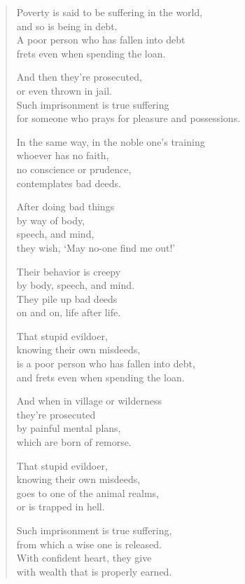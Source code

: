 \documentclass[12pt,openany]{book}%
\begin{document}
\begin{verse}%
Poverty is said to be suffering in the world, \\
and so is being in debt. \\
A poor person who has fallen into debt \\
frets even when spending the loan. 

And then they’re prosecuted, \\
or even thrown in jail. \\
Such imprisonment is true suffering \\
for someone who prays for pleasure and possessions. 

In the same way, in the noble one’s training \\
whoever has no faith, \\
no conscience or prudence, \\
contemplates bad deeds. 

After doing bad things \\
by way of body, \\
speech, and mind, \\
they wish, ‘May no-one find me out!’ 

Their behavior is creepy \\
by body, speech, and mind. \\
They pile up bad deeds \\
on and on, life after life. 

That stupid evildoer, \\
knowing their own misdeeds, \\
is a poor person who has fallen into debt, \\
and frets even when spending the loan. 

And when in village or wilderness \\
they’re prosecuted \\
by painful mental plans, \\
which are born of remorse. 

That stupid evildoer, \\
knowing their own misdeeds, \\
goes to one of the animal realms, \\
or is trapped in hell. 

Such imprisonment is true suffering, \\
from which a wise one is released. \\
With confident heart, they give \\
with wealth that is properly earned. 


\end{verse}
\end{document}
